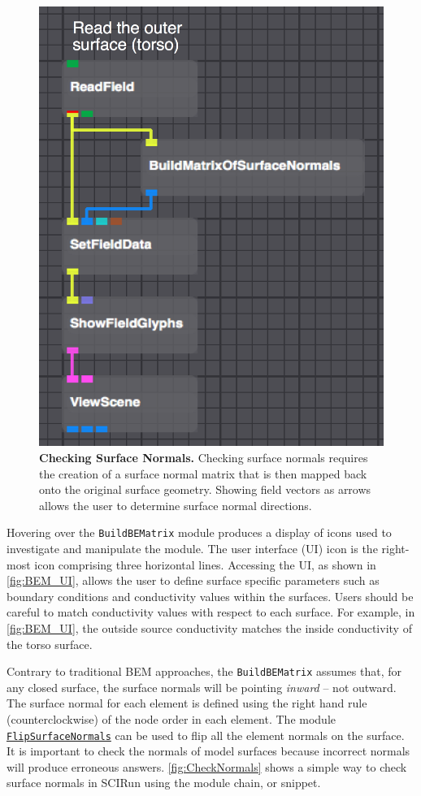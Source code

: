 \begin{figure}
\begin{center}
\includegraphics[width=.45\textwidth]{ECGToolkitGuide_figures/CheckSurfaceNormals.png}
\caption{{\bf Checking Surface Normals.} Checking surface normals requires the creation of a surface normal matrix that is then mapped back onto the original surface geometry. Showing field vectors as arrows allows the user to determine surface normal directions.}
\label{fig:CheckNormals}
\end{center}
\vspace{-.25in}
\end{figure}

Hovering over the {\tt BuildBEMatrix} module produces a display of icons used to investigate and manipulate the module.
The user interface (UI) icon is the right-most icon comprising three horizontal lines.
Accessing the UI, as shown in \autoref{fig:BEM_UI}, allows the user to define surface specific parameters such as boundary conditions and conductivity values within the surfaces.
Users should be careful to match conductivity values with respect to each surface.
For example, in \autoref{fig:BEM_UI}, the outside source conductivity matches the inside conductivity of the torso surface.

Contrary to traditional BEM approaches, the {\tt BuildBEMatrix} assumes that, for any closed surface, the surface normals will be pointing {\em inward} -- not outward. The surface
normal for each element is defined using the right hand rule (counterclockwise) of the node order in each element.
The module \href{http://sciinstitute.github.io/scirun.pages/modules.html#FlipSurfaceNormals}{\tt FlipSurfaceNormals} can be used to flip all the element normals on the surface.
It is important to check
the normals of model surfaces because incorrect normals will produce erroneous answers.
\autoref{fig:CheckNormals} shows a simple way to check surface normals in SCIRun using the module chain, or snippet.

